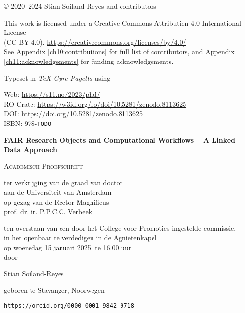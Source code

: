 \newpage

\vspace*{\fill}

© 2020--2024 Stian Soiland-Reyes and contributors

This work is licensed under a Creative Commons Attribution 4.0 International License \\
(CC-BY-4.0). \url{https://creativecommons.org/licenses/by/4.0/}\\
See Appendix \ref{ch10:contributions} for full list of contributors, and Appendix \ref{ch11:acknowledgements} for funding acknowledgements.


Typeset in \emph{TeX Gyre Pagella} using \mybanner

Web: \url{https://s11.no/2023/phd/} \\
RO-Crate: \url{https://w3id.org/ro/doi/10.5281/zenodo.8113625}\\
DOI: \url{https://doi.org/10.5281/zenodo.8113625}\\
ISBN: 978-\texttt{TODO}

\newpage
\thispagestyle{empty} 

\begin{center}

    
\Huge
\textbf{FAIR Research Objects and Computational Workflows – A Linked Data Approach}
     
\vspace*{\fill}

\LARGE
\textsc{Academisch Proefschrift}

\vspace*{\fill}

\large
{ \itshape

ter verkrijging van de graad van doctor\\
aan de Universiteit van Amsterdam\\
op gezag van de Rector Magnificus\\
prof. dr. ir. P.P.C.C. Verbeek

ten overstaan van een door het College voor Promoties ingestelde commissie,\\
in het openbaar te verdedigen in de Agnietenkapel\\
op woensdag 15 januari 2025, te 16.00 uur\\


door 
}

\vspace*{\fill}

\LARGE
Stian Soiland-Reyes

\large
geboren te Stavanger, Noorwegen 

\texttt{https://orcid.org/0000-0001-9842-9718} 
\end{center}


